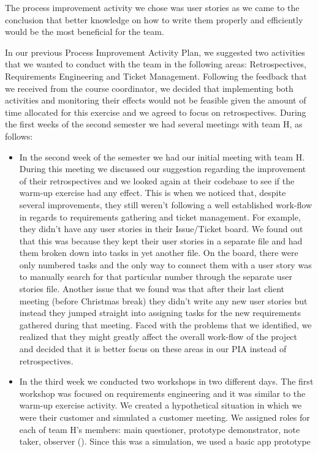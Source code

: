\documentclass[11pt]{article}
\begin{document}
\par
The process improvement activity we chose was user stories as we came to the conclusion that better knowledge on how to write them properly and efficiently would be the most beneficial for the team.

\par
    In our previous Process Improvement Activity Plan, we suggested two activities that we wanted to conduct with the team in the following areas: Retrospectives, Requirements Engineering and Ticket Management. Following the feedback that we received from the course coordinator, we decided that implementing both activities and monitoring their effects would not be feasible given the amount of time allocated for this exercise and we agreed to focus on retrospectives. During the first weeks of the second semester we had several meetings with team H, as follows:

\begin{itemize}
\item In the second week of the semester we had our initial meeting with team H. During this meeting we discussed our suggestion regarding the improvement of their retrospectives and we looked again at their codebase to see if the warm-up exercise had any effect. This is when we noticed that, despite several improvements, they still weren't following a well established work-flow in regards to requirements gathering and ticket management. For example, they didn't have any user stories in their Issue/Ticket board. We found out that this was because they kept their user stories in a separate file and had them broken down into tasks in yet another file. On the board, there were only numbered tasks and the only way to connect them with a user story was to manually search for that particular number through the separate user stories file. Another issue that we found was that after their last client meeting (before Christmas break) they didn't write any new user stories but instead they jumped straight into assigning tasks for the new requirements gathered during that meeting. Faced with the problems that we identified, we realized that they might greatly affect the overall work-flow of the project and decided that it is better focus on these areas in our PIA instead of retrospectives.

\item In the third week we conducted two workshops in two different days. The first workshop was focused on requirements engineering and it was similar to the warm-up exercise activity. We created a hypothetical situation in which we were their customer and simulated a customer meeting. We assigned roles for each of team H's members: main questioner, prototype demonstrator, note taker, observer (\citet[Chapter~4]{softengbook}). Since this was a simulation, we used a basic app prototype 
\end{itemize}
\end{document}
